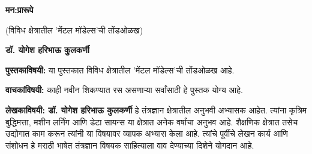 \documentclass{article}
\begin{document}
\thispagestyle{empty}
\null\vfill

\begin{center}
{\fontsize{58}{78}\selectfont\color{titleorange}\textbf{मन:प्रारूपे }}

\vspace{1em}

{\fontsize{12}{14}\selectfont\color{subtitleblue}(विविध क्षेत्रातील 'मेंटल मॉडेल्स'ची तोंडओळख)}

\vspace{5em}

{\fontsize{16}{20}\selectfont\color{authorgreen}\textbf{डॉ. योगेश हरिभाऊ कुलकर्णी}}
\end{center}

\vfill\null
\clearpage

\thispagestyle{empty}
\vspace*{0.5in}

\noindent\textbf{पुस्तकाविषयी:} या पुस्तकात विविध क्षेत्रातील 'मेंटल मॉडेल्स'ची तोंडओळख आहे. 

\vspace{1.5em}

\noindent\textbf{वाचकांविषयी:} काही नवीन शिकण्यात रस असणाऱ्या सर्वांसाठी हे पुस्तक योग्य आहे.

\vspace{1.5em}

\noindent\textbf{लेखकाविषयी: डॉ. योगेश हरिभाऊ कुलकर्णी} हे तंत्रज्ञान क्षेत्रातील अनुभवी अभ्यासक आहेत. त्यांना कृत्रिम बुद्धिमत्ता, मशीन लर्निंग आणि डेटा सायन्स या क्षेत्रात अनेक वर्षांचा अनुभव आहे. शैक्षणिक क्षेत्रात तसेच उद्योगात काम करून त्यांनी या विषयावर व्यापक अभ्यास केला आहे. त्यांचे पूर्वीचे लेखन कार्य आणि संशोधन हे मराठी भाषेत तंत्रज्ञान विषयक साहित्याला वाव देण्याच्या दिशेने योगदान आहे.

\vfill
\end{document}
